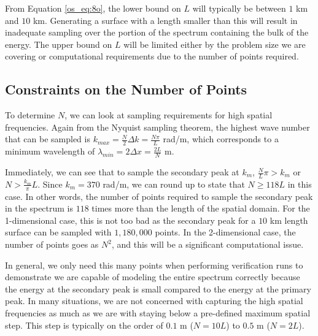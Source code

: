 From Equation \ref{os_eq:8o}, the lower bound on $L$ will typically be between $1$ km and $10$ km. Generating a surface with a length smaller than this will result in inadequate sampling over the portion of the spectrum containing the bulk of the energy. The upper bound on $L$ will be limited either by the problem size we are covering or computational requirements due to the number of points required.

\subsection{Constraints on the Number of Points}
To determine $N$, we can look at sampling requirements for high spatial frequencies. Again from the Nyquist sampling theorem, the highest wave number that can be sampled is $k_{max} = \frac{N}{2}\Delta k = \frac{N\pi}{L}$ rad/m, which corresponds to a minimum wavelength of $\lambda_{min} = 2\Delta x = \frac{2L}{N}$ m.

Immediately, we can see that to sample the secondary peak at $k_m$, $\frac{N}{L}\pi > k_m$ or $N > \frac{k_m}{\pi}L$. Since $k_m = 370$ rad/m, we can round up to state that $N \geq 118L$ in this case. In other words, the number of points required to sample the secondary peak in the spectrum is $118$ times more than the length of the spatial domain. For the 1-dimensional case, this is not too bad as the secondary peak for a $10$ km length surface can be sampled with $1,180,000$ points. In the 2-dimensional case, the number of points goes as $N^2$, and this will be a significant computational issue.

In general, we only need this many points when performing verification runs to demonstrate we are capable of modeling the entire spectrum correctly because the energy at the secondary peak is small compared to the energy at the primary peak. In many situations, we are not concerned with capturing the high spatial frequencies as much as we are with staying below a pre-defined maximum spatial step. This step is typically on the order of $0.1$ m ($N = 10L$) to $0.5$ m ($N = 2L$).

